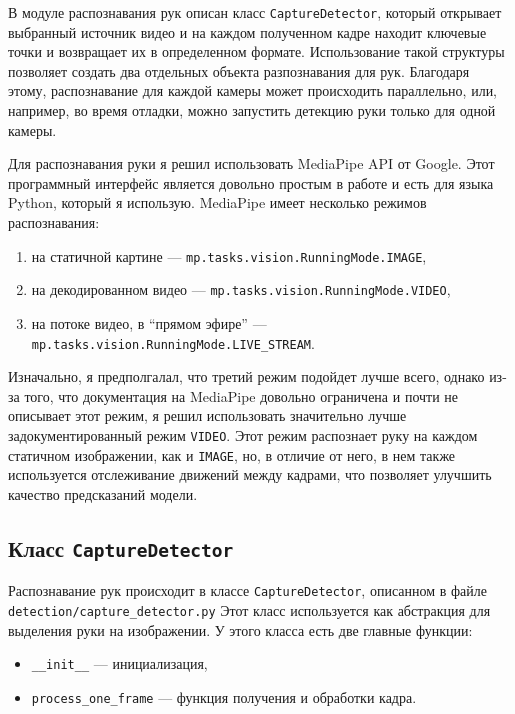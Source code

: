 \documentclass[12pt, a4paper]{article}
\begin{document}
В модуле распознавания рук описан класс \texttt{CaptureDetector}, который
открывает выбранный источник видео и на каждом полученном кадре находит
ключевые точки и возвращает их в определенном формате. Использование такой
структуры позволяет создать два отдельных объекта разпознавания для рук.
Благодаря этому, распознавание для каждой камеры может происходить параллельно, или, например, во время отладки, можно запустить детекцию руки только для одной камеры.

Для распознавания руки я решил использовать MediaPipe API от Google. Этот
программный интерфейс является довольно простым в работе и есть для языка
Python, который я использую.
MediaPipe имеет несколько режимов распознавания:
\begin{enumerate}
  \item на статичной картине --- \texttt{mp.tasks.vision.RunningMode.IMAGE},
  \item на декодированном видео --- \texttt{mp.tasks.vision.RunningMode.VIDEO},
  \item на потоке видео, в ``прямом эфире'' --- \texttt{mp.tasks.vision.RunningMode.LIVE\_STREAM}.
\end{enumerate}

Изначально, я предполгалал, что третий режим подойдет лучше всего, однако из-за
того, что документация на MediaPipe довольно ограничена и почти не описывает
этот режим, я решил использовать значительно лучше задокументированный режим
\texttt{VIDEO}. Этот режим распознает руку на каждом статичном изображении, как
и \texttt{IMAGE}, но, в отличие от него, в нем также используется отслеживание
движений между кадрами, что позволяет улучшить качество предсказаний модели.

\subsection{Класс \texttt{CaptureDetector}}
Распознавание рук происходит в классе \texttt{CaptureDetector}, описанном в файле \\ 
\texttt{detection/capture\_detector.py}
Этот класс используется как абстракция для выделения руки на изображении. У
этого класса есть две главные функции:
\begin{itemize}
  \item \texttt{\_\_init\_\_} --- инициализация,
  \item \texttt{process\_one\_frame} --- функция получения и обработки кадра.
\end{itemize}
\end{document}
